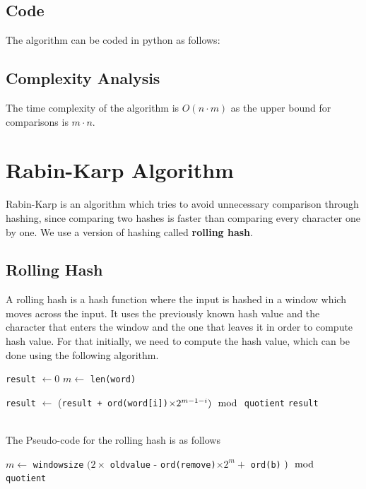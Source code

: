 \documentclass[a4paper, 12pt]{report}
\begin{document}
    \subsection{Code}
    The algorithm can be coded in python as follows:
    
    \subsection{Complexity Analysis}
    The time complexity of the algorithm is $O(n\cdot m)$ as the upper bound for comparisons is $m\cdot n$.



    \newpage
    \section{Rabin-Karp Algorithm}

    Rabin-Karp is an algorithm which tries to avoid unnecessary comparison through hashing, since comparing two hashes is faster than comparing every character one by one. We use a version of hashing called \textbf{rolling hash}.
    \subsection{Rolling Hash}
    A rolling hash is a hash function where the input is hashed in a window which moves across the input. It uses the previously known hash value and the character that enters the window and the one that leaves it in order to compute hash value.
    For that initially, we need to compute the hash value, which can be done using the following algorithm.
    \begin{algorithm}
        \begin{algorithmic}
        \State \texttt{result} $\gets 0$
        \State  $m \gets$ \texttt{len(word)}

          \State \texttt{result} $\gets$ (\texttt{result + ord(word[i])}$\times 2^{m-1-i})  \mod $ \texttt{quotient}
          \EndFor
          \State \Return \texttt{result}
        \EndFunction
        \end{algorithmic}
        \end{algorithm}
        \\
    The Pseudo-code for the rolling hash is as follows
    \begin{algorithm}
        \begin{algorithmic}
        \State $m \gets $ \texttt{windowsize}
        \State \Return $(2\times$ \texttt{oldvalue} - \texttt{ord(remove)}$\times 2^m+$  \texttt{ord(b)} $)\mod$ \texttt{quotient}
        \EndFunction
        \end{algorithmic}
        \end{algorithm}
\end{document}
